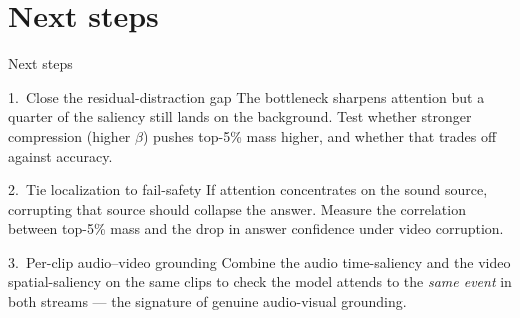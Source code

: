 \documentclass[10pt,aspectratio=169]{beamer}
\begin{document}
\section{Next steps}

\begin{frame}{Next steps}

\begin{block}{1.\ Close the residual-distraction gap}
  The bottleneck sharpens attention but a quarter of the saliency still lands on
  the background. Test whether stronger compression (higher $\beta$) pushes
  top-5\% mass higher, and whether that trades off against accuracy.
\end{block}

\begin{block}{2.\ Tie localization to fail-safety}
  If attention concentrates on the sound source, corrupting that source should
  collapse the answer. Measure the correlation between top-5\% mass and the drop
  in answer confidence under video corruption.
\end{block}

\begin{block}{3.\ Per-clip audio--video grounding}
  Combine the audio time-saliency and the video spatial-saliency on the same
  clips to check the model attends to the \emph{same event} in both streams ---
  the signature of genuine audio-visual grounding.
\end{block}

\end{frame}
\end{document}
